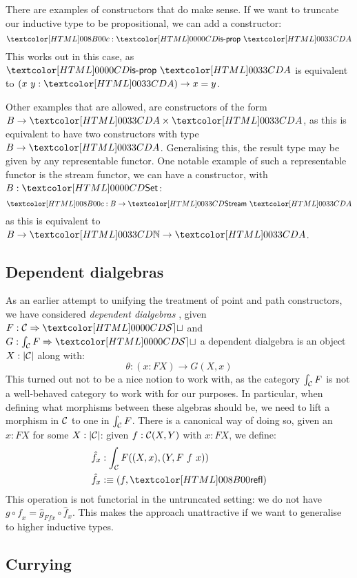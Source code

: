 There are examples of constructors that do make sense. If we want to
truncate our inductive type to be propositional, we can add a
constructor:
$$
\Ac : \isprop\ \Aty
$$
This works out in this case, as $\isprop\ \Aty$ is equivalent to
$(x\ y : \Aty) \to x = y$. 

Other examples that are allowed, are constructors of the form
$B \to \Aty \times \Aty$, as this is equivalent to have two
constructors with type $B \to \Aty$. Generalising this, the result type
may be given by any representable functor. One notable example of such
a representable functor is the stream functor, \eg we can have a
constructor, with $B : \Set$:
$$
\Ac : B \to \Stream\ \Aty
$$
as this is equivalent to $B \to \natty \to \Aty$.

\subsection{Dependent dialgebras}

As an earlier attempt to unifying the treatment of point and path
constructors, we have considered \emph{dependent dialgebras}
\cite{Altenkirch2015ii}, \ie given $F : \Func{\Cc}{\SET}$ and
$G : \Func{\int_{\Cc} F}{\SET}$ a dependent dialgebra is an object
$X : | \mathcal{C} |$ along with:
$$
\theta : (x : FX) \to G (X , x)
$$
This turned out not to be a nice notion to work with, as the category
$\int_{\mathcal{C}} F$ is not a well-behaved category to work with for our
purposes. In particular, when defining what morphisms between these
algebras should be, we need to lift a morphism in $\mathcal{C}$ to one in
$\int_{\mathcal{C}} F$. There is a canonical way of doing so, given an
$x : FX$ for some $X : | \mathcal{C} |$: given $f : \mathcal{C}(X,Y)$ with $x : FX$,
we define:
%
\begin{align*}
  &\hat{f}_x : \int_{\Cc} F ((X,x),(Y,F\ f\ x)) \\
  &\hat{f}_x \ddefeq (f , \refl)
\end{align*}
%
This operation is not functorial in the untruncated setting: we do not
have $\widehat{g \circ f}_x = \hat{g}_{F f x} \circ \hat{f}_x$. This
makes the approach unattractive if we want to generalise to higher
inductive types.

\subsection{Currying}

